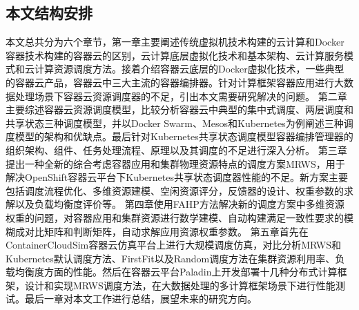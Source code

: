 \subsection{本文结构安排}
本文总共分为六个章节，第一章主要阐述传统虚拟机技术构建的云计算和Docker容器技术构建的容器云的区别，云计算底层虚拟化技术和基本架构、云计算服务模式和云计算资源调度方法。接着介绍容器云底层的Docker虚拟化技术，一些典型的容器云产品，容器云中三大主流的容器编排器。针对计算框架容器应用进行大数据处理场景下容器云资源调度器的不足，引出本文需要研究解决的问题。
第二章主要综述容器云资源调度模型，比较分析容器云中典型的集中式调度、两层调度和共享状态三种调度模型，并以Docker Swarm、Mesos和Kubernetes为例阐述三种调度模型的架构和优缺点。最后针对Kubernetes共享状态调度模型容器编排管理器的组织架构、组件、任务处理流程、原理以及其调度的不足进行深入分析。
第三章提出一种全新的综合考虑容器应用和集群物理资源特点的调度方案MRWS，用于解决OpenShift容器云平台下Kubernetes共享状态调度器性能的不足。新方案主要包括调度流程优化、多维资源建模、空闲资源评分，反馈器的设计、权重参数的求解以及负载均衡度评价等。
第四章使用FAHP方法解决新的调度方案中多维资源权重的问题，对容器应用和集群资源进行数学建模、自动构建满足一致性要求的模糊成对比矩阵和判断矩阵，自动求解应用资源权重参数。
第五章首先在ContainerCloudSim容器云仿真平台上进行大规模调度仿真，对比分析MRWS和Kubernetes默认调度方法、FirstFit以及Random调度方法在集群资源利用率、负载均衡度方面的性能。然后在容器云平台Paladin上开发部署十几种分布式计算框架，设计和实现MRWS调度方法，在大数据处理的多计算框架场景下进行性能测试。最后一章对本文工作进行总结，展望未来的研究方向。

